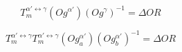 $$T_{m}^{\alpha'\leftrightarrow\gamma}\left(Og^{\alpha'}\right)\left(Og^{\gamma}\right)^{-1}=\Delta OR\label{eq:1}$$

$$T_{m}^{\alpha'\leftrightarrow\gamma}T_{m}^{\alpha'\leftrightarrow\gamma}\left(Og_{a}^{\alpha'}\right)\left(Og_{b}^{\alpha'}\right)^{-1}=\Delta OR\label{eq:2}$$
